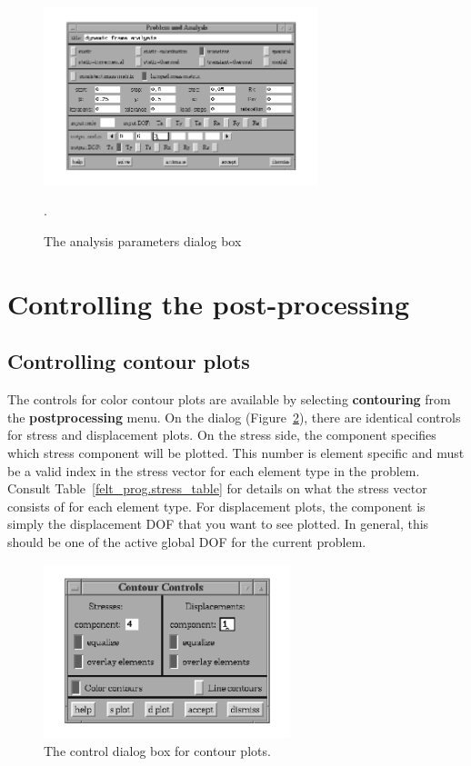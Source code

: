 \begin{figure}
\begin{center}
 \includegraphics[width=3.15in]{figures/velvet_analysis}
\end{center}
\caption{The analysis parameters dialog box}.
\label{velvet.analysis}
\end{figure}

\section{Controlling the post-processing}

\subsection{Controlling contour plots}

The controls for color contour plots are available by selecting 
{\bf contouring} from the {\bf postprocessing} menu.  On the dialog
(Figure~\ref{velvet.contour}), there are identical controls for stress
and displacement plots.  On the stress side, the component specifies which
stress component will be plotted.  This number is element specific and must
be a valid index in the stress vector for each element type in the problem.
Consult Table~\ref{felt_prog.stress_table} for details on what the 
stress vector consists of for each element type.  For displacement plots,
the component is simply the displacement DOF that you want to see plotted.
In general, this should be one of the active global DOF for the current
problem.

\begin{figure}
\begin{center}
 \includegraphics[width=2.82in]{figures/velvet_contour}
\end{center}
\caption{The control dialog box for contour plots.}
\label{velvet.contour}
\end{figure}

